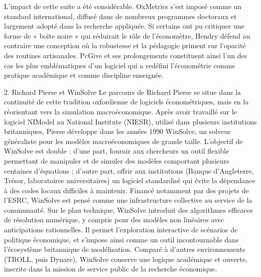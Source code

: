 L’impact de cette suite a été considérable. OxMetrics s’est imposé comme un standard international, diffusé dans de nombreux programmes doctoraux et largement adopté dans la recherche appliquée. Si certains ont pu critiquer une forme de « boîte noire » qui réduirait le rôle de l’économètre, Hendry défend au contraire une conception où la robustesse et la pédagogie priment sur l’opacité des routines artisanales. PcGive et ses prolongements constituent ainsi l’un des cas les plus emblématiques d’un logiciel qui a redéfini l’économétrie comme pratique académique et comme discipline enseignée.

2. Richard Pierse et WinSolve
Le parcours de Richard Pierse se situe dans la continuité de cette tradition oxfordienne de logiciels économétriques, mais en la réorientant vers la simulation macroéconomique. Après avoir travaillé sur le logiciel NIModel au National Institute (NIESR), utilisé dans plusieurs institutions britanniques, Pierse développe dans les années 1990 WinSolve, un solveur généraliste pour les modèles macroéconomiques de grande taille.
L’objectif de WinSolve est double : d’une part, fournir aux chercheurs un outil flexible permettant de manipuler et de simuler des modèles comportant plusieurs centaines d’équations ; d’autre part, offrir aux institutions (Banque d’Angleterre, Trésor, laboratoires universitaires) un logiciel standardisé qui évite la dépendance à des codes locaux difficiles à maintenir. Financé notamment par des projets de l’ESRC, WinSolve est pensé comme une infrastructure collective au service de la communauté.
Sur le plan technique, WinSolve introduit des algorithmes efficaces de résolution numérique, y compris pour des modèles non linéaires avec anticipations rationnelles. Il permet l’exploration interactive de scénarios de politique économique, et s’impose ainsi comme un outil incontournable dans l’écosystème britannique de modélisation. Comparé à d’autres environnements (TROLL, puis Dynare), WinSolve conserve une logique académique et ouverte, inscrite dans la mission de service public de la recherche économique.

